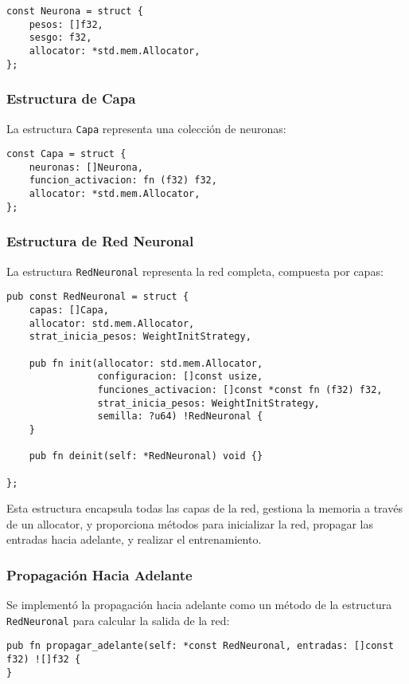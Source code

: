 \documentclass[twocolumn]{article}
\begin{document}
\begin{lstlisting}[style=customcode]
const Neurona = struct {
    pesos: []f32,
    sesgo: f32,
    allocator: *std.mem.Allocator,
};
\end{lstlisting}

\subsubsection{Estructura de Capa}
La estructura \texttt{Capa} representa una colección de neuronas:

\begin{lstlisting}[style=customcode]
const Capa = struct {
    neuronas: []Neurona,
    funcion_activacion: fn (f32) f32,
    allocator: *std.mem.Allocator,
};
\end{lstlisting}

\subsubsection{Estructura de Red Neuronal}
La estructura \texttt{RedNeuronal} representa la red completa, compuesta por capas:

\begin{lstlisting}[style=customcode]
pub const RedNeuronal = struct {
    capas: []Capa,
    allocator: std.mem.Allocator,
    strat_inicia_pesos: WeightInitStrategy,

    pub fn init(allocator: std.mem.Allocator,
                configuracion: []const usize,
                funciones_activacion: []const *const fn (f32) f32,
                strat_inicia_pesos: WeightInitStrategy,
                semilla: ?u64) !RedNeuronal {
    }

    pub fn deinit(self: *RedNeuronal) void {}

};
\end{lstlisting}

Esta estructura encapsula todas las capas de la red, gestiona la memoria a través de un allocator, y proporciona métodos para inicializar la red, propagar las entradas hacia adelante, y realizar el entrenamiento.

\subsubsection{Propagación Hacia Adelante}
Se implementó la propagación hacia adelante como un método de la estructura \texttt{RedNeuronal} para calcular la salida de la red:

\begin{lstlisting}[style=customcode]
pub fn propagar_adelante(self: *const RedNeuronal, entradas: []const f32) ![]f32 {
}
\end{lstlisting}
\end{document}
